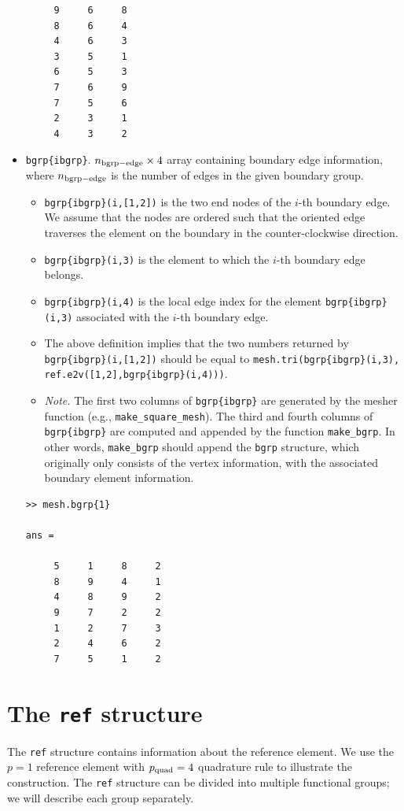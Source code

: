 \documentclass[openany,preprint,11pt]{article}
\begin{document}
\begin{itemize}
\begin{verbatim}
     9     6     8
     8     6     4
     4     6     3
     3     5     1
     6     5     3
     7     6     9
     7     5     6
     2     3     1
     4     3     2
\end{verbatim}
\item \texttt{bgrp\{ibgrp\}}. $n_{\rm bgrp-edge} \times 4$ array containing boundary edge information, where $n_{\rm bgrp-edge}$ is the number of edges in the given boundary group.
  \begin{itemize}
  \item \texttt{bgrp\{ibgrp\}(i,[1,2])} is the two end nodes of the $i$-th boundary edge. We assume that the nodes are ordered such that the oriented edge traverses the element on the boundary in the counter-clockwise direction.
  \item \texttt{bgrp\{ibgrp\}(i,3)} is the element to which the $i$-th boundary edge belongs.
  \item \texttt{bgrp\{ibgrp\}(i,4)} is the local edge index for the element \texttt{bgrp\{ibgrp\}(i,3)} associated with the $i$-th boundary edge.
  \item The above definition implies that the two numbers returned by \texttt{bgrp\{ibgrp\}(i,[1,2])} should be equal to \texttt{mesh.tri(bgrp\{ibgrp\}(i,3), ref.e2v([1,2],bgrp\{ibgrp\}(i,4)))}.
  \item \emph{Note.} The first two columns of \texttt{bgrp\{ibgrp\}} are generated by the mesher function (e.g., \texttt{make\_square\_mesh}).  The third and fourth columns of \texttt{bgrp\{ibgrp\}} are computed and appended by the function \texttt{make\_bgrp}. In other words, \texttt{make\_bgrp} should append the \texttt{bgrp} structure, which originally only consists of the vertex information, with the associated boundary element information.
  \end{itemize}
\begin{verbatim}
>> mesh.bgrp{1}
   
ans =

     5     1     8     2
     8     9     4     1
     4     8     9     2
     9     7     2     2
     1     2     7     3
     2     4     6     2
     7     5     1     2
\end{verbatim}
\end{itemize}
\section{The \texttt{ref} structure}
The \texttt{ref} structure contains information about the reference element.  We use the $p=1$ reference element with $p_{\rm quad} = 4$ quadrature rule to illustrate the construction.  The \texttt{ref} structure can be divided into multiple functional groups; we will describe each group separately.
\end{document}
